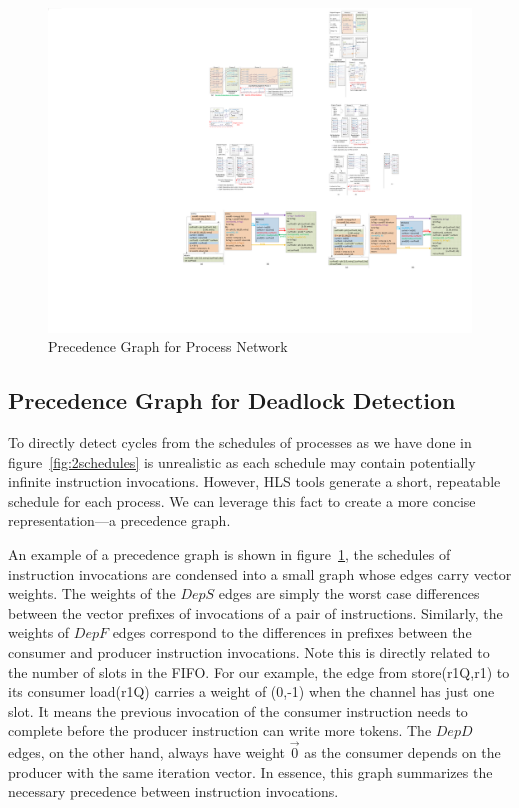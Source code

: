 \documentclass{sig-alternate}
\begin{document}
\begin{figure}[htp]
\begin{center}
\includegraphics[width=0.8\linewidth]{fig/predGraphNew.pdf}
\caption{Precedence Graph for Process Network
\label{fig:predgraph}}
\end{center}
\vspace{-2.5em}
\end{figure}


\subsection{Precedence Graph for Deadlock Detection}
To directly detect cycles from the schedules of processes as we have done in 
figure~\ref{fig:2schedules} is unrealistic as each schedule may contain potentially infinite instruction invocations.
However, HLS tools generate a short, repeatable schedule for each process.
We can leverage this fact to create a more concise representation---a precedence graph.


An example of a precedence graph is shown in figure~\ref{fig:predgraph}, the schedules of instruction invocations are condensed into a small graph whose edges carry vector weights. 
The weights of the $DepS$ edges are simply the worst case differences between the vector prefixes of invocations of a pair of instructions. 
Similarly, the weights of $DepF$ edges correspond to the differences in prefixes between
the consumer and producer instruction invocations. Note this is directly related
to the number of slots in the FIFO. For our example, the edge from store(r1Q,r1) to its consumer load(r1Q) carries a weight of (0,-1) when the channel has just one slot.
It means the previous invocation of the consumer instruction needs to complete before the producer instruction can write more tokens. The $DepD$ edges, on the other hand, always have weight $\vec{0}$ as the consumer depends on the producer with the same iteration vector. In essence, this graph
summarizes the necessary precedence between instruction invocations. 
\end{document}
